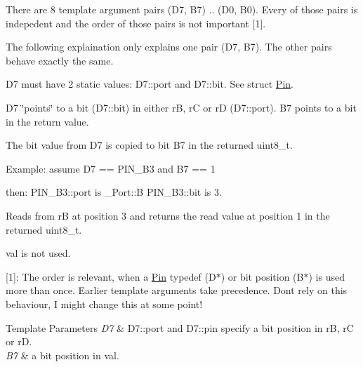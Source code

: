There are 8 template argument pairs ({\ttfamily D7}, {\ttfamily B7}) .. ({\ttfamily D0}, {\ttfamily B0}). Every of those pairs is indepedent and the order of those pairs is not important \mbox{[}1\mbox{]}.

The following explaination only explains one pair ({\ttfamily D7}, {\ttfamily B7}). The other pairs behave exactly the same.

{\ttfamily D7} must have 2 static values\+: {\ttfamily D7\+::port} and {\ttfamily D7\+::bit}. See struct \hyperlink{structports_1_1Pin}{Pin}.

{\ttfamily D7} \char`\"{}points\char`\"{} to a bit ({\ttfamily D7\+::bit}) in either {\ttfamily rB}, {\ttfamily rC} or {\ttfamily rD} ({\ttfamily D7\+::port}). {\ttfamily B7} points to a bit in the return value.

The bit value from {\ttfamily D7} is copied to bit {\ttfamily B7} in the returned {\ttfamily uint8\+\_\+t}.

Example\+: assume {\ttfamily D7 == P\+I\+N\+\_\+\+B3} and {\ttfamily B7 == 1}

then\+: {\ttfamily P\+I\+N\+\_\+\+B3\+::port} is {\ttfamily \+\_\+\+Port\+::B} {\ttfamily P\+I\+N\+\_\+\+B3\+::bit} is 3.

Reads from {\ttfamily rB} at position 3 and returns the read value at position 1 in the returned {\ttfamily uint8\+\_\+t}.

{\ttfamily val} is not used.

\mbox{[}1\mbox{]}\+: The order is relevant, when a \hyperlink{structports_1_1Pin}{Pin} {\ttfamily typedef} (D$\ast$) or bit position (B$\ast$) is used more than once. Earlier template arguments take precedence. Don\textquotesingle{}t rely on this behaviour, I might change this at some point!


\begin{DoxyTemplParams}{Template Parameters}
{\em D7} & {\ttfamily D7\+::port} and {\ttfamily D7\+::pin} specify a bit position in {\ttfamily rB}, {\ttfamily rC} or {\ttfamily rD}. \\
\hline
{\em B7} & a bit position in {\ttfamily val}. \\
\hline
\end{DoxyTemplParams}
\hypertarget{namespaceports_a2a0a17506421aaa10b7c087124a09b72}{}\label{namespaceports_a2a0a17506421aaa10b7c087124a09b72} 
